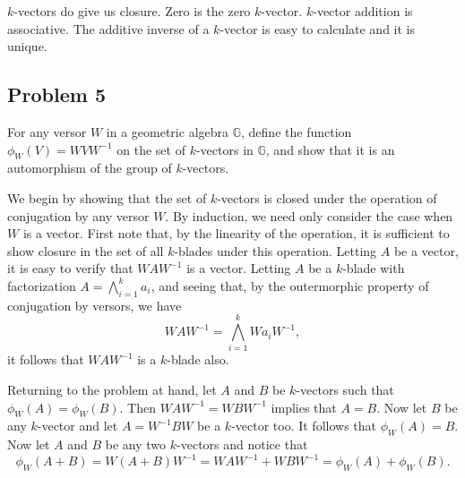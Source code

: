 \documentclass[12pt]{article}
\newcommand{\G}{\mathbb{G}}
\begin{document}
$k$-vectors do give us closure.  Zero is the zero $k$-vector.  $k$-vector addition is associative.
The additive inverse of a $k$-vector is easy to calculate and it is unique.

\subsection*{Problem 5}

For any versor $W$ in a geometric algebra $\G$, define
the function $\phi_W(V)=WVW^{-1}$ on the set of $k$-vectors in $\G$,
and show that it is an automorphism of the group of $k$-vectors.

We begin by showing that the set of $k$-vectors is closed under
the operation of conjugation by any versor $W$.  By induction,
we need only consider the case when $W$ is a vector.
First note that, by the linearity of the operation, it is sufficient
to show closure in the set of all $k$-blades under this operation.
Letting $A$ be a vector, it is easy to verify that $WAW^{-1}$ is a vector.
Letting $A$ be a $k$-blade with factorization $A=\bigwedge_{i=1}^k a_i$,
and seeing that, by the outermorphic property of conjugation by versors,
we have
\begin{equation*}
WAW^{-1}=\bigwedge_{i=1}^k Wa_iW^{-1},
\end{equation*}
it follows that $WAW^{-1}$ is a $k$-blade also.

Returning to the problem at hand, let $A$ and $B$ be $k$-vectors such that $\phi_W(A)=\phi_W(B)$.
Then $WAW^{-1}=WBW^{-1}$ implies that $A=B$.  Now let $B$
be any $k$-vector and let $A=W^{-1}BW$ be a $k$-vector too.  It follows that $\phi_W(A)=B$.
Now let $A$ and $B$ be any two $k$-vectors and notice that
\begin{equation*}
\phi_W(A+B) = W(A+B)W^{-1} = WAW^{-1}+WBW^{-1} = \phi_W(A)+\phi_W(B).
\end{equation*}
\end{document}
